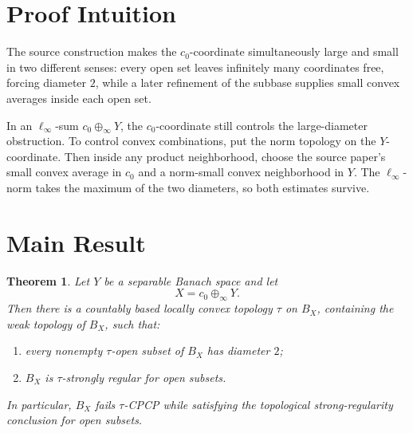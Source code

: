 \documentclass[11pt]{article}
\newtheorem{theorem}{Theorem}
\newcommand{\cnull}{c_0}
\begin{document}
\section*{Proof Intuition}

The source construction makes the \(c_0\)-coordinate simultaneously large and
small in two different senses: every open set leaves infinitely many coordinates
free, forcing diameter \(2\), while a later refinement of the subbase supplies
small convex averages inside each open set.

In an \(\ell_\infty\)-sum \(\cnull\oplus_\infty Y\), the \(c_0\)-coordinate
still controls the large-diameter obstruction. To control convex combinations,
put the norm topology on the \(Y\)-coordinate. Then inside any product
neighborhood, choose the source paper's small convex average in \(c_0\) and a
norm-small convex neighborhood in \(Y\). The \(\ell_\infty\)-norm takes the
maximum of the two diameters, so both estimates survive.

\section*{Main Result}

\begin{theorem}
Let \(Y\) be a separable Banach space and let
\[
   X=\cnull\oplus_\infty Y.
\]
Then there is a countably based locally convex topology \(\tau\) on \(B_X\),
containing the weak topology of \(B_X\), such that:
\begin{enumerate}
\item every nonempty \(\tau\)-open subset of \(B_X\) has diameter \(2\);
\item \(B_X\) is \(\tau\)-strongly regular for open subsets.
\end{enumerate}
In particular, \(B_X\) fails \(\tau\)-CPCP while satisfying the topological
strong-regularity conclusion for open subsets.
\end{theorem}
\end{document}
